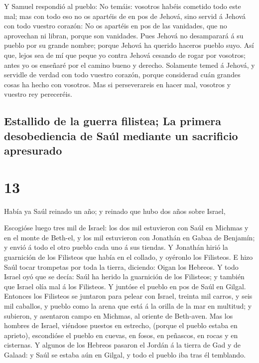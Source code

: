  Y Samuel respondió al pueblo: No temáis: vosotros habéis
cometido todo este mal; mas con todo eso no os apartéis de en pos de
Jehová, sino servid á Jehová con todo vuestro corazón: 
No os apartéis en pos de las vanidades, que no aprovechan ni libran,
porque son vanidades.  Pues Jehová no desamparará á su
pueblo por su grande nombre; porque Jehová ha querido haceros pueblo
suyo.  Así que, lejos sea de mí que peque yo contra
Jehová cesando de rogar por vosotros; antes yo os enseñaré por el camino
bueno y derecho.  Solamente temed á Jehová, y servidle de
verdad con todo vuestro corazón, porque considerad cuán grandes cosas ha
hecho con vosotros.  Mas si perseverareis en hacer mal,
vosotros y vuestro rey pereceréis.

\hypertarget{estallido-de-la-guerra-filistea-la-primera-desobediencia-de-sauxfal-mediante-un-sacrificio-apresurado}{%
\subsection{Estallido de la guerra filistea; La primera desobediencia de
Saúl mediante un sacrificio
apresurado}\label{estallido-de-la-guerra-filistea-la-primera-desobediencia-de-sauxfal-mediante-un-sacrificio-apresurado}}

\hypertarget{section-09-13}{%
\section{13}\label{section-09-13}}

 Había ya Saúl reinado un año; y reinado que hubo dos años
sobre Israel,

 Escogióse luego tres mil de Israel: los dos mil
estuvieron con Saúl en Michmas y en el monte de Beth-el, y los mil
estuvieron con Jonathán en Gabaa de Benjamín; y envió á todo el otro
pueblo cada uno á sus tiendas.  Y Jonathán hirió la
guarnición de los Filisteos que había en el collado, y oyéronlo los
Filisteos. E hizo Saúl tocar trompetas por toda la tierra, diciendo:
Oigan los Hebreos.  Y todo Israel oyó que se decía: Saúl
ha herido la guarnición de los Filisteos; y también que Israel olía mal
á los Filisteos. Y juntóse el pueblo en pos de Saúl en Gilgal.
 Entonces los Filisteos se juntaron para pelear con
Israel, treinta mil carros, y seis mil caballos, y pueblo como la arena
que está á la orilla de la mar en multitud; y subieron, y asentaron
campo en Michmas, al oriente de Beth-aven.  Mas los
hombres de Israel, viéndose puestos en estrecho, (porque el pueblo
estaba en aprieto), escondióse el pueblo en cuevas, en fosos, en
peñascos, en rocas y en cisternas.  Y algunos de los
Hebreos pasaron el Jordán á la tierra de Gad y de Galaad: y Saúl se
estaba aún en Gilgal, y todo el pueblo iba tras él temblando.

